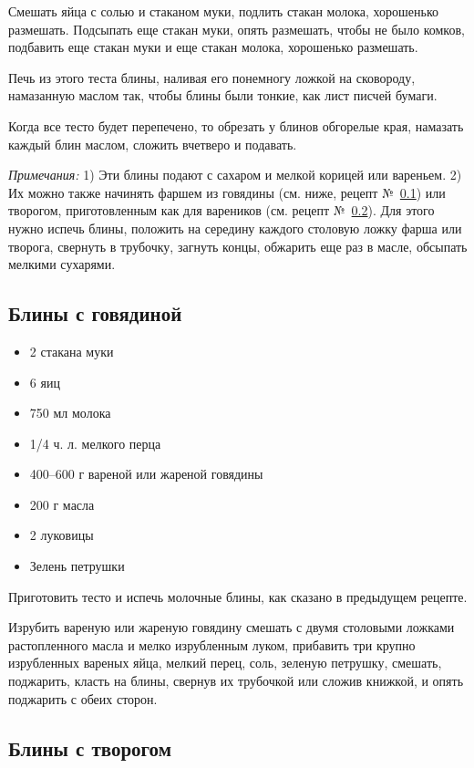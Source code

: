 Смешать яйца с солью и стаканом муки, подлить стакан молока, хорошенько размешать. Подсыпать еще стакан муки, опять размешать, чтобы не было комков, подбавить еще стакан муки и еще стакан молока, хорошенько размешать.

Печь из этого теста блины, наливая его понемногу ложкой на сковороду, намазанную маслом так, чтобы блины были тонкие, как лист писчей бумаги.

Когда все тесто будет перепечено, то обрезать у блинов обгорелые края, намазать каждый блин маслом, сложить вчетверо и подавать.

\emph{Примечания:} 1) Эти блины подают с сахаром и мелкой корицей или вареньем. 2) Их можно также начинять фаршем из говядины (см. ниже, рецепт №~\ref{sec:rec5}) или творогом, приготовленным как для вареников (см. рецепт №~\ref{sec:rec6}). Для этого нужно испечь блины, положить на середину каждого столовую ложку фарша или творога, свернуть в трубочку, загнуть концы, обжарить еще раз в масле, обсыпать мелкими сухарями.

\subsection{Блины с говядиной}\label{sec:rec5}

\begin{itemize}
	\item 2 стакана муки
    \item 6 яиц 
    \item 750 мл молока
    \item 1/4 ч. л. мелкого перца
    \item 400–600 г вареной или жареной говядины 
    \item 200 г масла 
    \item 2 луковицы 
    \item Зелень петрушки
\end{itemize}

Приготовить тесто и испечь молочные блины, как сказано в предыдущем рецепте.

Изрубить вареную или жареную говядину смешать с двумя столовыми ложками растопленного масла и мелко изрубленным луком, прибавить три крупно изрубленных вареных яйца, мелкий перец, соль, зеленую петрушку, смешать, поджарить, класть на блины, свернув их трубочкой или сложив книжкой, и опять поджарить с обеих сторон.

\subsection{Блины с творогом}\label{sec:rec6}

